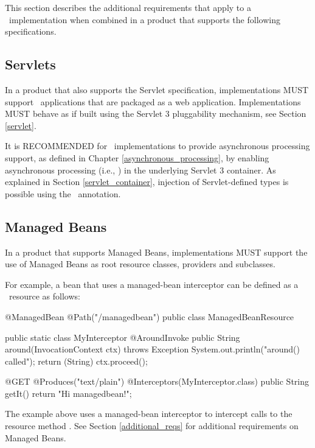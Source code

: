 This section describes the additional requirements that apply to a \jaxrs\ implementation when combined in a product that supports the following specifications. 

\subsection{Servlets}
\label{servlets}

In a product that also supports the Servlet specification, implementations MUST support \jaxrs\ applications that are packaged as a web application. Implementations MUST behave as if built using the Servlet 3 pluggability mechanism, see Section \ref{servlet}. 

It is RECOMMENDED for \jaxrs\ implementations to provide asynchronous processing support, as defined in Chapter \ref{asynchronous_processing}, by enabling asynchronous processing (i.e., ) in the underlying Servlet 3 container.
As explained in Section \ref{servlet_container}, injection of Servlet-defined types is possible using the \Context\ annotation.

\subsection{Managed Beans}
\label{managed_beans}

In a product that supports Managed Beans, implementations MUST support the use of Managed Beans as root resource classes, providers and  subclasses. 

For example, a bean that uses a managed-bean interceptor can be defined as a \jaxrs\ resource as follows:

\begin{listing}{1}
@ManagedBean
@Path("/managedbean")
public class ManagedBeanResource {

    public static class MyInterceptor {
        @AroundInvoke
        public String around(InvocationContext ctx) throws Exception {
            System.out.println("around() called");
            return (String) ctx.proceed();
        }
    }

    @GET
    @Produces("text/plain")
    @Interceptors(MyInterceptor.class)
    public String getIt() {
        return "Hi managedbean!";
    }
}
\end{listing}

The example above uses a managed-bean interceptor to intercept calls to the resource method . See Section \ref{additional_reqs} for additional requirements on Managed Beans.

